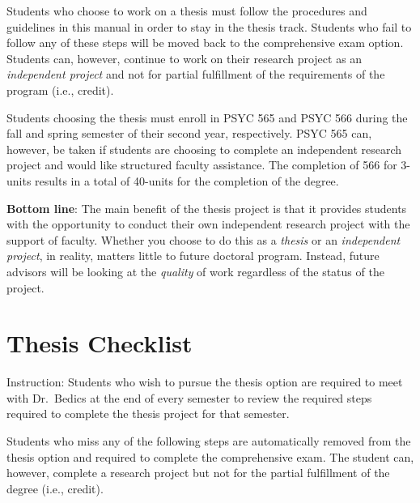 \documentclass[]{book}
\begin{document}
Students who choose to work on a thesis must follow the procedures and guidelines in this manual in order to stay in the thesis track. Students who fail to follow any of these steps will be moved back to the comprehensive exam option. Students can, however, continue to work on their research project as an \emph{independent project} and not for partial fulfillment of the requirements of the program (i.e., credit).

Students choosing the thesis must enroll in PSYC 565 and PSYC 566 during the fall and spring semester of their second year, respectively. PSYC 565 can, however, be taken if students are choosing to complete an independent research project and would like structured faculty assistance. The completion of 566 for 3-units results in a total of 40-units for the completion of the degree.

\textbf{Bottom line}: The main benefit of the thesis project is that it provides students with the opportunity to conduct their own independent research project with the support of faculty. Whether you choose to do this as a \emph{thesis} or an \emph{independent project}, in reality, matters little to future doctoral program. Instead, future advisors will be looking at the \emph{quality} of work regardless of the status of the project.

\hypertarget{thesis-checklist}{%
\chapter{Thesis Checklist}\label{thesis-checklist}}

Instruction: Students who wish to pursue the thesis option are required to meet with Dr.~Bedics at the end of every semester to review the required steps required to complete the thesis project for that semester.

Students who miss any of the following steps are automatically removed from the thesis option and required to complete the comprehensive exam. The student can, however, complete a research project but not for the partial fulfillment of the degree (i.e., credit).
\end{document}
